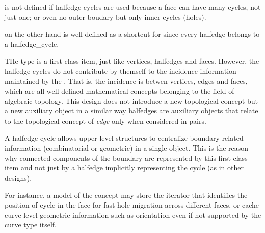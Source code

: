 { is not defined if halfedge cycles  are used because a face
can have many cycles, not just one; or oven no outer boudary but only inner cycles (holes).

 on the other hand is well defined as a shortcut for 
since every halfedge belongs to a halfedge_cycle.

THe type  is a first-class  item, just like vertices, halfedges and faces.
However, the halfedge cycles do not contribute  by themself to the incidence information 
maintained by the . That is, the incidence is betwen vertices, edges and faces,
which are all well defined mathematical concepts belonging to the field of algebraic topology.
This design does not introduce a new topological concept but a new
auxiliary object in a similar way halfedges are auxiliary objects that 
relate to the topological concept of {\em edge} only when considered in pairs.

A halfedge cycle allows upper level structures to centralize boundary-related information
(combinatorial or geometric) in a single object. This is the reason why 
connected components of the boundary are represented by this first-class  item 
and not just by a halfedge implicitly representing the cycle (as in other designs).

For instance, a model of the  concept  may store the iterator that identifies the position of
cycle in the face for fast hole migration across different faces, or cache curve-level geometric
information such as orientation even if not supported by the curve type itself.
}

